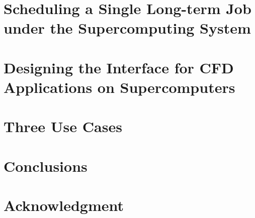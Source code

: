 \documentclass[10pt,conference]{IEEEtran}
\begin{document}
\section{Scheduling a Single Long-term Job under the Supercomputing System}

\section{Designing the Interface for CFD Applications on Supercomputers}

\section{Three Use Cases}

\section{Conclusions}

\section*{Acknowledgment}

\nocite{ex1,ex2}

%

\end{document}

